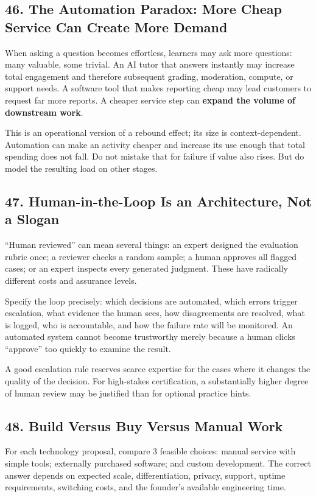 \subsection*{46. The Automation Paradox: More Cheap Service Can Create More Demand}

When asking a question becomes effortless, learners may ask more questions: many valuable, some trivial. An AI tutor that answers instantly may increase total engagement and therefore subsequent grading, moderation, compute, or support needs. A software tool that makes reporting cheap may lead customers to request far more reports. A cheaper service step can \textbf{expand the volume of downstream work}.

This is an operational version of a rebound effect; its size is context-dependent. Automation can make an activity cheaper and increase its use enough that total spending does not fall. Do not mistake that for failure if value also rises. But do model the resulting load on other stages.

\subsection*{47. Human-in-the-Loop Is an Architecture, Not a Slogan}

``Human reviewed'' can mean several things: an expert designed the evaluation rubric once; a reviewer checks a random sample; a human approves all flagged cases; or an expert inspects every generated judgment. These have radically different costs and assurance levels.

Specify the loop precisely: which decisions are automated, which errors trigger escalation, what evidence the human sees, how disagreements are resolved, what is logged, who is accountable, and how the failure rate will be monitored. An automated system cannot become trustworthy merely because a human clicks ``approve'' too quickly to examine the result.

A good escalation rule reserves scarce expertise for the cases where it changes the quality of the decision. For high-stakes certification, a substantially higher degree of human review may be justified than for optional practice hints.

\subsection*{48. Build Versus Buy Versus Manual Work}

For each technology proposal, compare 3 feasible choices: manual service with simple tools; externally purchased software; and custom development. The correct answer depends on expected scale, differentiation, privacy, support, uptime requirements, switching costs, and the founder's available engineering time.

